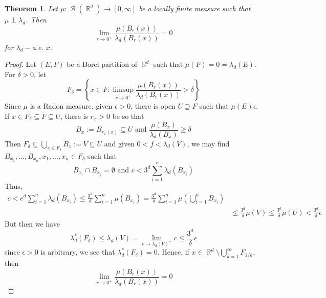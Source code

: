 \documentclass[12pt, a4paper]{memoir}
\DeclareMathOperator{\R}{{\mathbb{R}}}
\newtheorem{theorem}{Theorem}[section]
\theoremstyle{nonumberplain}
\newtheorem{proof}{Proof}
\DeclareMathOperator{\B}{\mathcal{B}}
\begin{document}
\begin{theorem}
    Let $\mu:\B(\R^d)\to[0,\infty]$ be a locally finite measure such that $\mu\perp\lambda_d$.
    Then
    \begin{equation*}
        \lim_{r\to 0^+}\frac{\mu(B_r(x))}{\lambda_d(B_r(x))}=0
    \end{equation*}
    for $\lambda_d-$a.e. $x$.
\end{theorem}
\begin{proof}
    Let $(E,F)$ be a Borel partition of $\R^d$ such that $\mu(F)=0=\lambda_d(E)$.
    For $\delta>0$, let
    \begin{equation*}
        F_\delta=\left\{x\in F:\limsup_{r\to 0^+}\frac{\mu(B_r(x))}{\lambda_d(B_r(x))}>\delta\right\}
    \end{equation*}
    Since $\mu$ is a Radon measure, given $\epsilon>0$, there is open $U\supseteq F$ such that $\mu(E)\epsilon$.
    If $x\in F_\delta\subseteq F\subseteq U$, there is $r_x>0$ be so that
    \begin{equation*}
        B_x:=B_{r_x(x)}\subseteq U\text{ and }\frac{\mu(B_x)}{\lambda_d(B_x)}\geq\delta
    \end{equation*}
    Then $F_\delta\subseteq\bigcup_{x\in F_\delta}B_x:=V\subseteq U$ and given $0<f<\lambda_d(V)$, we may find $B_{x_1},\ldots,B_{x_n},x_1,\ldots,x_n\in F_\delta$ such that
    \begin{equation*}
        B_{x_i}\cap B_{x_j}=\emptyset\text{ and }c<3^d\sum_{i=1}^n \lambda_d(B_{x_i})
    \end{equation*}
    Thus,
    \begin{align*}
        c<e^d\sum_{i=1}^n\lambda_d(B_{x_i})\leq\frac{3^d}{\delta}\sum_{i=1}^n\mu(B_{x_i})=\frac{3^d}{\delta}\sum_{i=1}^n\mu\left(\bigcup_{i=1}^n B_{x_i}\right)\\
        &\leq\frac{3^d}{\delta}\mu(V)\leq\frac{3^d}{\delta}\mu(U)<\frac{3^d}{\delta}\epsilon
    \end{align*}
    But then we have
    \begin{equation*}
        \lambda_d^*(F_\delta)\leq\lambda_d(V)=\lim_{c\to\lambda_d(V)^-}c\leq\frac{3^d}{\delta}\epsilon
    \end{equation*}
    since $\epsilon>0$ is arbitrary, we see that $\lambda_d^*(F_\delta)=0$.
    Hence, if $x\in\R^d\setminus\bigcup_{k=1}^\infty F_{1/k}$, then
    \begin{equation*}
        \lim_{r\to 0^+}\frac{\mu(B_r(x))}{\lambda_d(B_r(x))}=0
    \end{equation*}
\end{proof}
\end{document}
